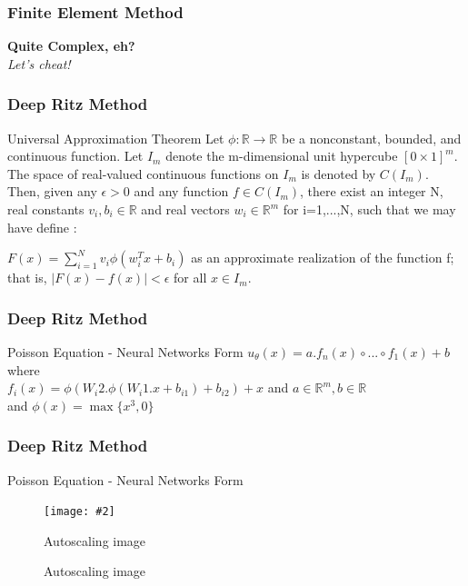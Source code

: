 \documentclass{beamer}
\makeatletter
\newcommand{\R}{\mathbb{R}}
\newcommand{\fitimage}[2][\@nil]{
	\begin{figure}
		\begin{adjustbox}{width=0.9\textwidth, totalheight=\textheight-2\baselineskip-2\baselineskip,keepaspectratio}
			\texttt{[image: \#2]}
		\end{adjustbox}
		\def\tmp{#1}%
		\ifx\tmp\@nnil
		\else
		\caption{#1}
		\fi
	\end{figure}
}
\makeatother
\begin{document}
\begin{frame}
	\frametitle{Finite Element Method}
	
	\textbf{Quite Complex, eh?}\centering\\
	\textit{Let's cheat!}\centering\\
	
\end{frame}


\begin{frame}
	\frametitle{Deep Ritz Method}
	
	\begin{block}{Universal Approximation Theorem}
		Let $\phi:\R \to \R$ be a nonconstant, bounded, and continuous function. Let $I_m$ denote the m-dimensional unit hypercube $[0 \times 1]^m$. The space of real-valued continuous functions on $I_m$ is denoted by $C(I_m)$. Then, given any $\epsilon >0$ and any function $f \in C(I_m)$, there exist an integer N, real constants $v_i, b_i \in \R$ and real vectors $w_i \in \R^m$ for i=1,...,N, such that we may have define :
		
		$F(x) = \sum_{i=1}^{N} v_i \phi(w_{i}^{T}x + b_i)$
		as an approximate realization of the function f; that is,
		$|F(x)-f(x)| < \epsilon$
		for all $x\in I_m$. 
		
	\end{block}	
\end{frame}



\begin{frame}
	\frametitle{Deep Ritz Method}
	
	\begin{block}{Poisson Equation - Neural Networks Form}
	$u_{\theta}(x) = a . f_{n}(x) \circ ... \circ f_{1}(x) +b$ \\
	where \\
	$f_{i}(x) = \phi(W_i2 . \phi(W_i1 . x + b_{i1}) + b_{i2}) + x $ and $a \in \R^m, b\in\R $ \\
	and $\phi(x) = \max\{x^3,0\}$
	\end{block}	
\end{frame}

\begin{frame}
	\frametitle{Deep Ritz Method}
	
	\begin{block}{Poisson Equation - Neural Networks Form}
		\fitimage[Autoscaling image]{DRM.png}
	\end{block}	
	
\end{frame}
\end{document}
